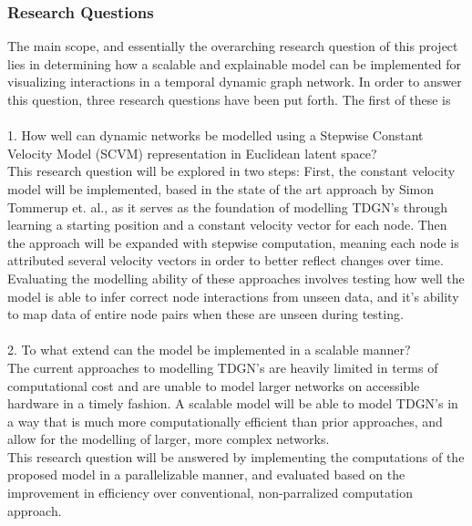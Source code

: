 \subsubsection{Research Questions} 
\label{sec:Intro:ResearchQs}
The main scope, and essentially the overarching research question of this project lies in determining how a scalable and explainable model can be implemented for visualizing interactions in a temporal dynamic graph network.
In order to answer this question, three research questions have been put forth.
The first of these is
\\\\
\hspace*{5mm} 1. How well can dynamic networks be modelled using a Stepwise Constant Velocity Model (SCVM) representation in Euclidean latent space?
\\
This research question will be explored in two steps:
First, the constant velocity model will be implemented, based in the state of the art approach by Simon Tommerup et. al., as it serves as the foundation of modelling TDGN's through learning a starting position and a constant velocity vector for each node.
Then the approach will be expanded with stepwise computation, meaning each node is attributed several velocity vectors in order to better reflect changes over time.
\\
Evaluating the modelling ability of these approaches involves testing how well the model is able to infer correct node interactions from unseen data, and it's ability to map data of entire node pairs when these are unseen during testing.
\\\\
\hspace*{5mm} 2. To what extend can the model be implemented in a scalable manner?
\\
The current approaches to modelling TDGN's are heavily limited in terms of computational cost and are unable to model larger networks on accessible hardware in a timely fashion.
A scalable model will be able to model TDGN's in a way that is much more computationally efficient than prior approaches, and allow for the modelling of larger, more complex networks.
\\
This research question will be answered by implementing the computations of the proposed model in a parallelizable manner, and evaluated based on the improvement in efficiency over conventional, non-parralized computation approach.
